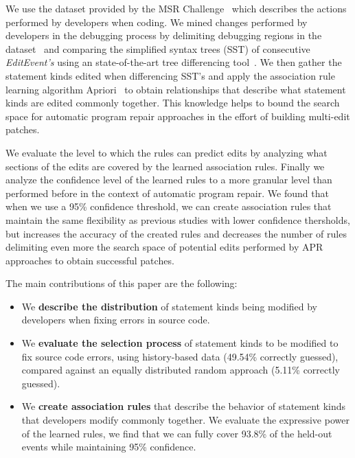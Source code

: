 \documentclass[sigconf]{acmart}
\begin{document}
We use the dataset provided by the MSR Challenge~\cite{msr18challenge}
which describes the actions performed
by developers when coding.
We mined changes performed by developers in the debugging
process by delimiting debugging regions in the 
dataset~\cite{msr18challenge} and comparing the simplified syntax
trees (SST) of consecutive \textit{EditEvent's} using an 
state-of-the-art tree differencing tool~\cite{Pawlik16Apted}.
We then gather the statement kinds edited when
differencing SST's and apply the association
rule learning algorithm Apriori~\cite{Agrawal94}
to obtain relationships that describe what statement kinds
are edited commonly together. This knowledge helps to 
bound the search space for automatic program repair approaches
in the effort of building multi-edit patches.

We evaluate the level to which the rules can predict edits
by analyzing what sections of the edits are covered by the 
learned association rules. 
Finally we analyze
the confidence level of the learned rules to a more granular 
level than performed before in the context of automatic
program repair. We found that when we use a 95\% confidence
threshold, we can create association
rules that maintain the same flexibility as previous
studies with lower confidence thersholds\cite{Soto18}, but increases
the accuracy of the created rules and decreases the number of rules
delimiting even more the search space of potential edits
performed by APR approaches to obtain successful patches.

The main contributions of this paper are the following:
\begin{itemize}
\item We \textbf{describe the distribution} of statement kinds being
modified by developers when fixing errors in source code. 

\item We \textbf{evaluate
the selection process} of statement kinds to be modified
to fix source code errors, using history-based data (49.54\% correctly guessed), compared against
an equally distributed random approach (5.11\% correctly guessed).

\item We \textbf{create association rules} that describe the behavior
of statement kinds that developers modify commonly together. 
We evaluate the expressive power of the learned rules, we find
that we can fully cover 93.8\% of the held-out events while maintaining
95\% confidence.

\end{itemize}
\end{document}
